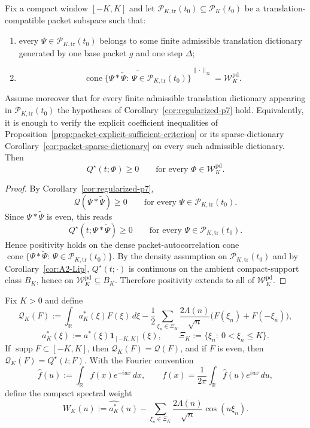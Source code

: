 \begin{theorem}\label{thm:PSD-pd}
Fix a compact window $[-K,K]$ and let
$\mathcal P_{K,\mathrm{tr}}(t_0)\subseteq \mathcal P_K(t_0)$ be a
translation-compatible packet subspace such that:
\begin{enumerate}
  \item every $\Psi\in\mathcal P_{K,\mathrm{tr}}(t_0)$ belongs to some finite
  admissible translation dictionary generated by one base packet $g$ and one
  step $\Delta$;
  \item
  \[
    \overline{
      \operatorname{cone}\{\Psi*\widetilde{\Psi}:\ \Psi\in\mathcal P_{K,\mathrm{tr}}(t_0)\}
    }^{\|\cdot\|_\infty}
    =
    \mathcal W_K^{\mathrm{pd}}.
  \]
\end{enumerate}
Assume moreover that for every finite admissible translation dictionary
appearing in $\mathcal P_{K,\mathrm{tr}}(t_0)$ the hypotheses of
Corollary~\ref{cor:regularized-p7} hold. Equivalently, it is enough to verify
the explicit coefficient inequalities of Proposition~\ref{prop:packet-explicit-sufficient-criterion}
or its sparse-dictionary Corollary~\ref{cor:packet-sparse-dictionary} on every
such admissible dictionary.
Then
\[
  Q^\star(t;\Phi)\ge0\qquad\text{for every }\Phi\in \mathcal W_K^{\mathrm{pd}}.
\]
\end{theorem}

\begin{proof}
By Corollary~\ref{cor:regularized-p7},
\[
  \mathcal Q(\Psi*\widetilde{\Psi})\ge0
  \qquad\text{for every }\Psi\in\mathcal P_{K,\mathrm{tr}}(t_0).
\]
Since $\Psi*\widetilde{\Psi}$ is even, this reads
\[
  Q^\star(t;\Psi*\widetilde{\Psi})\ge0
  \qquad\text{for every }\Psi\in\mathcal P_{K,\mathrm{tr}}(t_0).
\]
Hence positivity holds on the dense packet-autocorrelation cone
$\operatorname{cone}\{\Psi*\widetilde{\Psi}:\ \Psi\in\mathcal P_{K,\mathrm{tr}}(t_0)\}$.
By the density assumption on $\mathcal P_{K,\mathrm{tr}}(t_0)$ and by Corollary~\ref{cor:A2-Lip},
$Q^\star(t;\cdot)$ is continuous on the ambient compact-support class $B_K$,
hence on $\mathcal W_K^{\mathrm{pd}}\subseteq B_K$. Therefore positivity extends
to all of $\mathcal W_K^{\mathrm{pd}}$.
\end{proof}

\begin{definition}\label{def:compact-spectral-weight}
Fix $K>0$ and define
\[
  \mathcal Q_K(F)
  :=
  \int_{\mathbb R} a_K^*(\xi)F(\xi)\,d\xi
  -
  \frac12\sum_{\xi_n\in\Xi_K}\frac{2\Lambda(n)}{\sqrt n}\bigl(F(\xi_n)+F(-\xi_n)\bigr),
\]
\[
  a_K^*(\xi):=a^*(\xi)\mathbf 1_{[-K,K]}(\xi),
  \qquad
  \Xi_K:=\{\xi_n:\ 0<\xi_n\le K\}.
\]
If $\operatorname{supp}F\subset[-K,K]$, then $\mathcal Q_K(F)=\mathcal Q(F)$, and
if $F$ is even, then $\mathcal Q_K(F)=Q^\star(t;F)$.
With the Fourier convention
\[
  \widehat f(u):=\int_{\mathbb R} f(x)e^{-iux}\,dx,
  \qquad
  f(x)=\frac1{2\pi}\int_{\mathbb R}\widehat f(u)e^{iux}\,du,
\]
define the compact spectral weight
\[
  W_K(u)
  :=
  \widehat{a_K^*}(u)
  -
  \sum_{\xi_n\in\Xi_K}\frac{2\Lambda(n)}{\sqrt n}\cos(u\xi_n).
\]
\end{definition}

